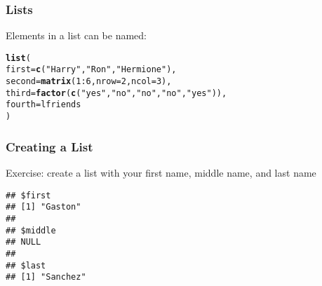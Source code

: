 \documentclass[12pt]{beamer}\usepackage[]{graphicx}\usepackage[]{color}
\makeatletter
\newcommand{\hlnum}[1]{\textcolor[rgb]{0.686,0.059,0.569}{#1}}%
\newcommand{\hlstr}[1]{\textcolor[rgb]{0.192,0.494,0.8}{#1}}%
\newcommand{\hlopt}[1]{\textcolor[rgb]{0,0,0}{#1}}%
\newcommand{\hlstd}[1]{\textcolor[rgb]{0.345,0.345,0.345}{#1}}%
\newcommand{\hlkwc}[1]{\textcolor[rgb]{0.333,0.667,0.333}{#1}}%
\newcommand{\hlkwd}[1]{\textcolor[rgb]{0.737,0.353,0.396}{\textbf{#1}}}%
\newenvironment{kframe}{%
 \def\at@end@of@kframe{}%
 \ifinner\ifhmode%
  \def\at@end@of@kframe{\end{minipage}}%
  \begin{minipage}{\columnwidth}%
 \fi\fi%
 \def\FrameCommand##1{\hskip\@totalleftmargin \hskip-\fboxsep
 \colorbox{shadecolor}{##1}\hskip-\fboxsep
     \hskip-\linewidth \hskip-\@totalleftmargin \hskip\columnwidth}%
 \MakeFramed {\advance\hsize-\width
   \@totalleftmargin\z@ \linewidth\hsize
   \@setminipage}}%
 {\par\unskip\endMakeFramed%
 \at@end@of@kframe}
\newenvironment{knitrout}{}{} %
\makeatother
\begin{document}

\begin{frame}[fragile]
\frametitle{Lists}

Elements in a list can be named:
\begin{knitrout}\footnotesize
{}\color{fgcolor}\begin{kframe}
\begin{alltt}
\hlkwd{list}\hlstd{(}
  \hlkwc{first} \hlstd{=} \hlkwd{c}\hlstd{(}\hlstr{"Harry"}\hlstd{,} \hlstr{"Ron"}\hlstd{,} \hlstr{"Hermione"}\hlstd{),}
  \hlkwc{second} \hlstd{=} \hlkwd{matrix}\hlstd{(}\hlnum{1}\hlopt{:}\hlnum{6}\hlstd{,} \hlkwc{nrow} \hlstd{=} \hlnum{2}\hlstd{,} \hlkwc{ncol} \hlstd{=} \hlnum{3}\hlstd{),}
  \hlkwc{third} \hlstd{=} \hlkwd{factor}\hlstd{(}\hlkwd{c}\hlstd{(}\hlstr{"yes"}\hlstd{,} \hlstr{"no"}\hlstd{,} \hlstr{"no"}\hlstd{,} \hlstr{"no"}\hlstd{,} \hlstr{"yes"}\hlstd{)),}
  \hlkwc{fourth} \hlstd{= lfriends}
\hlstd{)}
\end{alltt}
\end{kframe}
\end{knitrout}

\end{frame}


\begin{frame}[fragile]
\frametitle{Creating a List}

Exercise: create a list with your first name, middle name, and last name
\begin{knitrout}\footnotesize
{}\color{fgcolor}\begin{kframe}
\begin{verbatim}
## $first
## [1] "Gaston"
## 
## $middle
## NULL
## 
## $last
## [1] "Sanchez"
\end{verbatim}
\end{kframe}
\end{knitrout}

\end{frame}


\begin{frame}
\begin{center}
\Huge{}
\end{center}
\end{frame}
\end{document}
